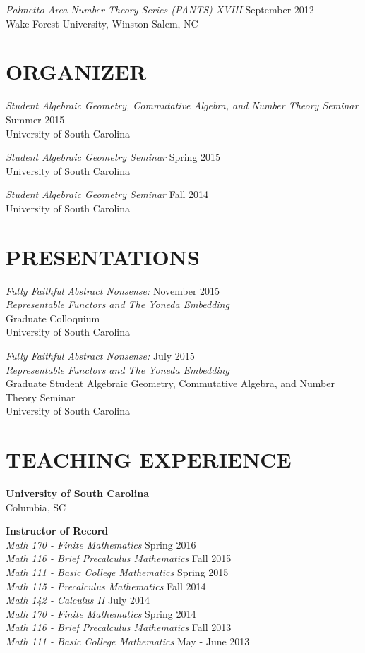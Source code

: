 \documentclass[line,overlapped]{res}
\begin{document}
\begin{resume}
         {\sl Palmetto Area Number Theory Series (PANTS) XVIII} \hfill September 2012\\
         Wake Forest University, Winston-Salem, NC

 \section{ORGANIZER}
	 {\sl Student Algebraic Geometry, Commutative Algebra, and Number Theory Seminar} \hfill Summer 2015\\
	 University of South Carolina
	 
         {\sl Student Algebraic Geometry Seminar} \hfill Spring 2015\\
	 University of South Carolina

         {\sl Student Algebraic Geometry Seminar} \hfill Fall 2014\\
	 University of South Carolina
        
         \newpage

 \section{PRESENTATIONS}
         {\sl Fully Faithful Abstract Nonsense:} \hfill November 2015\\
         {\sl Representable Functors and The Yoneda Embedding}\\
         Graduate Colloquium\\
         University of South Carolina

         {\sl Fully Faithful Abstract Nonsense:} \hfill July 2015\\
         {\sl Representable Functors and The Yoneda Embedding}\\
         Graduate Student Algebraic Geometry, Commutative Algebra, and Number Theory Seminar\\
         University of South Carolina

 \section{TEACHING EXPERIENCE}
         {\bf University of South Carolina}\\Columbia, SC
         
         {\bf Instructor of Record}\\
         {\sl Math 170 - Finite Mathematics} \hfill Spring 2016\\
         {\sl Math 116 - Brief Precalculus Mathematics} \hfill Fall 2015\\
         {\sl Math 111 - Basic College Mathematics} \hfill Spring 2015\\
         {\sl Math 115 - Precalculus Mathematics} \hfill Fall 2014\\
         {\sl Math 142 - Calculus II} \hfill July 2014\\
         {\sl Math 170 - Finite Mathematics} \hfill Spring 2014\\
         {\sl Math 116 - Brief Precalculus Mathematics} \hfill Fall 2013\\
         {\sl Math 111 - Basic College Mathematics} \hfill May - June 2013


\end{resume}
\end{document}
